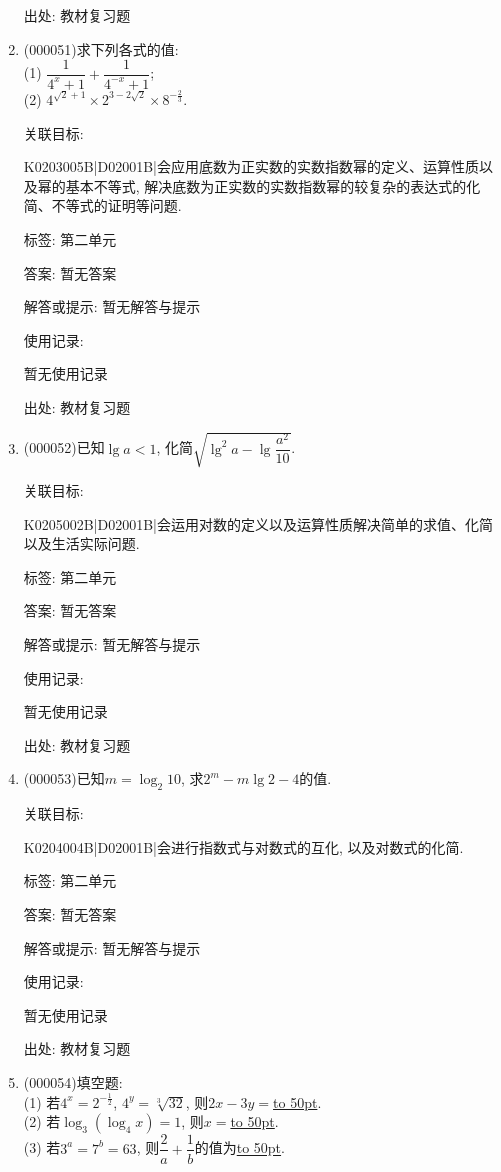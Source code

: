 \documentclass[10pt,a4paper]{article}
\newcommand{\blank}[1]{\underline{\hbox to #1pt{}}}
\begin{document}
\begin{enumerate}[1.]
出处: 教材复习题
\item { (000051)}求下列各式的值:\\
(1) $\dfrac{1}{4^x+1}+\dfrac{1}{4^{-x}+1}$;\\
(2) $4^{\sqrt 2+1}\times 2^{3-2\sqrt 2}\times 8^{-\frac 23}$.


关联目标:

K0203005B|D02001B|会应用底数为正实数的实数指数幂的定义、运算性质以及幂的基本不等式, 解决底数为正实数的实数指数幂的较复杂的表达式的化简、不等式的证明等问题.



标签: 第二单元

答案: 暂无答案

解答或提示: 暂无解答与提示

使用记录:

暂无使用记录


出处: 教材复习题
\item { (000052)}已知$\lg a<1$, 化简$\sqrt{\lg^2 a-\lg \dfrac{a^2}{10}}$.


关联目标:

K0205002B|D02001B|会运用对数的定义以及运算性质解决简单的求值、化简以及生活实际问题.



标签: 第二单元

答案: 暂无答案

解答或提示: 暂无解答与提示

使用记录:

暂无使用记录


出处: 教材复习题
\item { (000053)}已知$m=\log_2 10$, 求$2^m-m\lg 2-4$的值.


关联目标:

K0204004B|D02001B|会进行指数式与对数式的互化, 以及对数式的化简.



标签: 第二单元

答案: 暂无答案

解答或提示: 暂无解答与提示

使用记录:

暂无使用记录


出处: 教材复习题
\item { (000054)}填空题:\\
(1) 若$4^x=2^{-\frac{1}{2}}$, $4^y=\sqrt[3]{32}$, 则$2x-3y=$\blank{50}.\\
(2) 若$\log_3(\log_4 x)=1$, 则$x=$\blank{50}.\\
(3) 若$3^a=7^b=63$, 则$\dfrac 2a+\dfrac 1b$的值为\blank{50}.\\



\end{enumerate}
\end{document}
